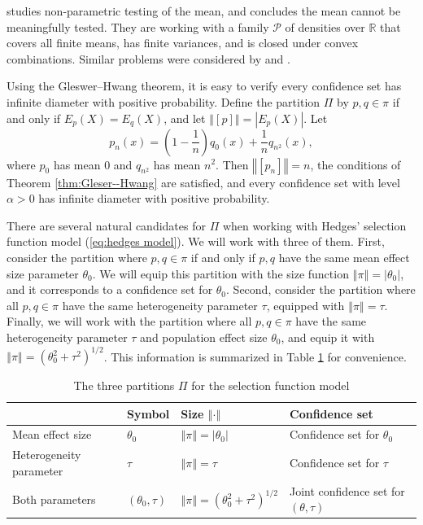 \documentclass[article]{ajs}
\providecommand{\tabularnewline}{\\}
\numberwithin{equation}{section}
\numberwithin{figure}{section}
\theoremstyle{plain}
\theoremstyle{definition}
\theoremstyle{definition}
\theoremstyle{plain}
\renewcommand{\sqrt}[1]{{(#1)^{1/2}}}
\begin{document}
\citet{bahadur1956nonexistence} studies non-parametric testing of
the mean, and concludes the mean cannot be meaningfully tested. They
are working with a family $\mathcal{P}$ of densities over $\mathbb{R}$
that covers all finite means, has finite variances, and is closed
under convex combinations. Similar problems were considered by \citet{romano2004non}
and \citet{Donoho1988-hg}.

Using the Gleswer--Hwang theorem, it is easy to verify every confidence
set has infinite diameter with positive probability. Define the partition
$\Pi$ by $p,q\in\pi$ if and only if $E_{p}(X)=E_{q}(X)$, and let
$\left\Vert [p]\right\Vert =|E_{p}(X)|$. Let
\[
p_{n}(x)=\left(1-\frac{1}{n}\right)q_{0}(x)+\frac{1}{n}q_{n^{2}}(x),
\]
where $p_{0}$ has mean $0$ and $q_{n^{2}}$ has mean $n^{2}$. Then
$\left\Vert [p_{n}]\right\Vert =n$, the conditions of Theorem \ref{thm:Gleser--Hwang}
are satisfied, and every confidence set with level $\alpha>0$ has
infinite diameter with positive probability.

There are several natural candidates for $\Pi$ when working with
Hedges' selection function model (\ref{eq:hedges model}). We will
work with three of them. First, consider the partition where $p,q\in\pi$
if and only if $p,q$ have the same mean effect size parameter $\theta_{0}$.
We will equip this partition with the size function $\left\Vert \pi\right\Vert =|\theta_{0}|$,
and it corresponds to a confidence set for $\theta_{0}$. Second,
consider the partition where all $p,q\in\pi$ have the same heterogeneity
parameter $\tau$, equipped with $\left\Vert \pi\right\Vert =\tau$.
Finally, we will work with the partition where all $p,q\in\pi$ have
the same heterogeneity parameter $\tau$ and population effect size
$\theta_{0}$, and equip it with $\left\Vert \pi\right\Vert =\sqrt{\theta_{0}^{2}+\tau^{2}}$.
This information is summarized in Table \ref{tab:Possible partitions}
for convenience. 

\begin{table}
\noindent \centering{}\caption{\label{tab:Possible partitions}The three partitions $\Pi$ for the
selection function model}
{\small{}}%
\begin{tabular}{llll}
 & {\small{}Symbol} & {\small{}Size $\left\Vert \cdot\right\Vert $} & {\small{}Confidence set}\tabularnewline
\hline 
{\small{}Mean effect size} & {\small{}$\theta_{0}$} & {\small{}$\left\Vert \pi\right\Vert =|\theta_{0}|$} & {\small{}Confidence set for $\theta_{0}$}\tabularnewline
{\small{}Heterogeneity parameter} & {\small{}$\tau$} & {\small{}$\left\Vert \pi\right\Vert =\tau$} & {\small{}Confidence set for $\tau$}\tabularnewline
Both parameters & {\small{}$(\theta_{0},\tau)$} & {\small{}$\left\Vert \pi\right\Vert =\sqrt{\theta_{0}^{2}+\tau^{2}}$} & {\small{}Joint confidence set for $(\theta,\tau)$}\tabularnewline
\end{tabular}
\end{table}
\end{document}
